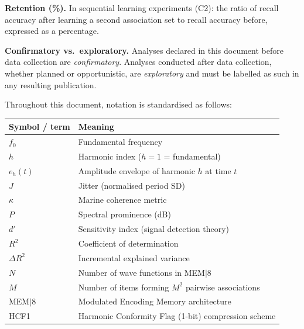 \documentclass[11pt, a4paper]{article}
\newcommand{\mem}{MEM$|$8}
\newcommand{\hcf}{HCF1}
\begin{document}
\begin{defbox}
\smallskip
\textbf{Retention (\%).}  In sequential learning experiments (C2): the ratio of
recall accuracy after learning a second association set to recall accuracy before,
expressed as a percentage.

\smallskip
\textbf{Confirmatory vs.\ exploratory.}  Analyses declared in this document before
data collection are \emph{confirmatory}.  Analyses conducted after data collection,
whether planned or opportunistic, are \emph{exploratory} and must be labelled as
such in any resulting publication.
\end{defbox}

\bigskip

\noindent Throughout this document, notation is standardised as follows:

\noindent\begin{minipage}{\textwidth}
\centering
\renewcommand{\arraystretch}{1.3}
\begin{tabular}{ll}
\toprule
\textbf{Symbol / term} & \textbf{Meaning} \\
\midrule
$f_0$              & Fundamental frequency \\
$h$                & Harmonic index ($h = 1$ = fundamental) \\
$e_h(t)$           & Amplitude envelope of harmonic $h$ at time $t$ \\
$J$                & Jitter (normalised period SD) \\
$\kappa$           & Marine coherence metric \\
$P$                & Spectral prominence (dB) \\
$d'$               & Sensitivity index (signal detection theory) \\
$R^2$              & Coefficient of determination \\
$\Delta R^2$       & Incremental explained variance \\
$N$                & Number of wave functions in \mem{} \\
$M$                & Number of items forming $M^2$ pairwise associations \\
\mem{}             & Modulated Encoding Memory architecture \\
\hcf{}             & Harmonic Conformity Flag (1-bit) compression scheme \\
\bottomrule
\end{tabular}
\end{minipage}

\end{document}
